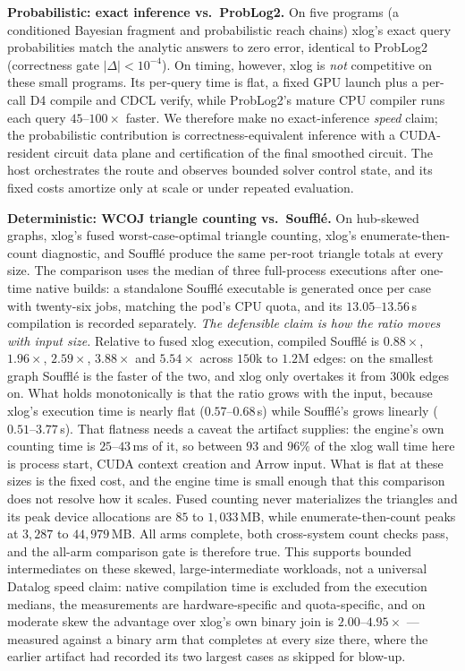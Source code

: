 \textbf{Probabilistic: exact inference vs.\ ProbLog2.} On five programs (a conditioned Bayesian fragment and probabilistic reach chains) xlog's exact query probabilities match the analytic answers to zero error, identical to ProbLog2 (correctness gate $|\Delta| < 10^{-4}$). On timing, however, xlog is \emph{not} competitive on these small programs. Its per-query time is flat, a fixed GPU launch plus a per-call D4 compile and CDCL verify, while ProbLog2's mature CPU compiler runs each query $45$--$100\times$ faster. We therefore make no exact-inference \emph{speed} claim; the probabilistic contribution is correctness-equivalent inference with a CUDA-resident circuit data plane and certification of the final smoothed circuit. The host orchestrates the route and observes bounded solver control state, and its fixed costs amortize only at scale or under repeated evaluation.

\textbf{Deterministic: WCOJ triangle counting vs.\ Soufflé.} On hub-skewed graphs, xlog's fused worst-case-optimal triangle counting, xlog's enumerate-then-count diagnostic, and Soufflé produce the same per-root triangle totals at every size. The comparison uses the median of three full-process executions after one-time native builds: a standalone Soufflé executable is generated once per case with twenty-six jobs, matching the pod's CPU quota, and its $13.05$--$13.56$\,s compilation is recorded separately. \emph{The defensible claim is how the ratio moves with input size.} Relative to fused xlog execution, compiled Soufflé is $0.88\times$, $1.96\times$, $2.59\times$, $3.88\times$ and $5.54\times$ across $150$k to $1.2$M edges: on the smallest graph Soufflé is the faster of the two, and xlog only overtakes it from $300$k edges on. What holds monotonically is that the ratio grows with the input, because xlog's execution time is nearly flat ($0.57$--$0.68$\,s) while Soufflé's grows linearly ($0.51$--$3.77$\,s). That flatness needs a caveat the artifact supplies: the engine's own counting time is $25$--$43$\,ms of it, so between $93$ and $96\%$ of the xlog wall time here is process start, CUDA context creation and Arrow input. What is flat at these sizes is the fixed cost, and the engine time is small enough that this comparison does not resolve how it scales. Fused counting never materializes the triangles and its peak device allocations are $85$ to $1{,}033$\,MB, while enumerate-then-count peaks at $3{,}287$ to $44{,}979$\,MB. All arms complete, both cross-system count checks pass, and the all-arm comparison gate is therefore true. This supports bounded intermediates on these skewed, large-intermediate workloads, not a universal Datalog speed claim: native compilation time is excluded from the execution medians, the measurements are hardware-specific and quota-specific, and on moderate skew the advantage over xlog's own binary join is $2.00$--$4.95\times$ --- measured against a binary arm that completes at every size there, where the earlier artifact had recorded its two largest cases as skipped for blow-up.

